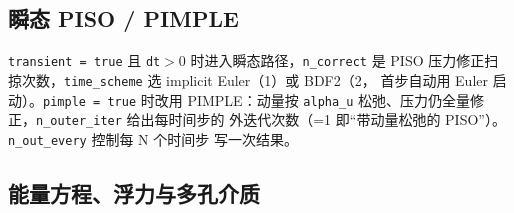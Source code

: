 \documentclass[11pt,a4paper]{ctexart}
\begin{document}
\subsection{瞬态 PISO / PIMPLE}

\texttt{transient = true} 且 \texttt{dt}$>0$ 时进入瞬态路径，\texttt{n\_correct}
是 PISO 压力修正扫掠次数，\texttt{time\_scheme} 选 implicit Euler（1）或 BDF2（2，
首步自动用 Euler 启动）。\texttt{pimple = true} 时改用 PIMPLE：动量按
\texttt{alpha\_u} 松弛、压力仍全量修正，\texttt{n\_outer\_iter} 给出每时间步的
外迭代次数（=1 即``带动量松弛的 PISO''）。\texttt{n\_out\_every} 控制每 N 个时间步
写一次结果。

\subsection{能量方程、浮力与多孔介质}
\end{document}
